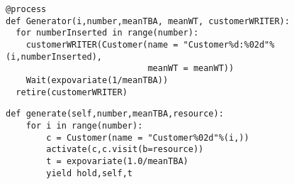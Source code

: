 \begin{lstlisting}[firstnumber=20, label=fig:sim:generator, caption=Generatorprocessen for Simulationsversionen]
@process
def Generator(i,number,meanTBA, meanWT, customerWRITER):
  for numberInserted in range(number):
    customerWRITER(Customer(name = "Customer%d:%02d"%(i,numberInserted),
                            meanWT = meanWT))
    Wait(expovariate(1/meanTBA))
  retire(customerWRITER)
\end{lstlisting}

\begin{lstlisting}[firstnumber=11, label=fig:simpy:generator, caption=Generator funktion for simpy]
def generate(self,number,meanTBA,resource):         
    for i in range(number):
        c = Customer(name = "Customer%02d"%(i,))
        activate(c,c.visit(b=resource))              
        t = expovariate(1.0/meanTBA)               
        yield hold,self,t
\end{lstlisting}

